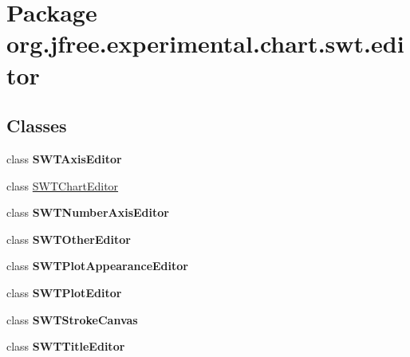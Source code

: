 \hypertarget{namespaceorg_1_1jfree_1_1experimental_1_1chart_1_1swt_1_1editor}{}\section{Package org.\+jfree.\+experimental.\+chart.\+swt.\+editor}
\label{namespaceorg_1_1jfree_1_1experimental_1_1chart_1_1swt_1_1editor}
\subsection*{Classes}
\begin{DoxyCompactItemize}
\item 
class {\bfseries S\+W\+T\+Axis\+Editor}
\item 
class \mbox{\hyperlink{classorg_1_1jfree_1_1experimental_1_1chart_1_1swt_1_1editor_1_1_s_w_t_chart_editor}{S\+W\+T\+Chart\+Editor}}
\item 
class {\bfseries S\+W\+T\+Number\+Axis\+Editor}
\item 
class {\bfseries S\+W\+T\+Other\+Editor}
\item 
class {\bfseries S\+W\+T\+Plot\+Appearance\+Editor}
\item 
class {\bfseries S\+W\+T\+Plot\+Editor}
\item 
class {\bfseries S\+W\+T\+Stroke\+Canvas}
\item 
class {\bfseries S\+W\+T\+Title\+Editor}
\end{DoxyCompactItemize}
